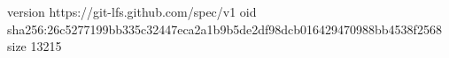 version https://git-lfs.github.com/spec/v1
oid sha256:26c5277199bb335c32447eca2a1b9b5de2df98dcb016429470988bb4538f2568
size 13215
